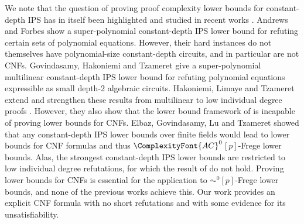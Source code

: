 \documentclass[11pt,letter]{article}
\theoremstyle{remark} %
\newcommand{\ACZ}{\ensuremath{\ComplexityFont{AC}^0}}
\begin{document}
{    %

    We note that the question of proving proof complexity lower bounds for constant-depth IPS has in itself been highlighted and studied in recent works \cite{AF22, GHT22, HLT24, EGLT25, BLRS25}. Andrews and Forbes \cite{AF22} show a super-polynomial constant-depth IPS lower bound for refuting certain sets of polynomial equations. However, their hard instances do not themselves have polynomial-size constant-depth circuits, and in particular are not CNFs. Govindasamy, Hakoniemi and Tzameret \cite{GHT22} give a super-polynomial multilinear constant-depth IPS lower bound for refuting polynomial equations expressible as small depth-2 algebraic circuits. Hakoniemi, Limaye and Tzameret \cite{HLT24} extend and strengthen these results from multilinear to low individual degree proofs  \cite{GHT22}. However, they also show that the lower bound framework of \cite{GHT22, HLT24} is incapable of proving lower bounds for CNFs. Elbaz, Govindasamy, Lu and Tzameret \cite{EGLT25} showed that any constant-depth IPS lower bounds over finite fields would lead to lower bounds for CNF formulas and thus \ACZ$[p]$-Frege lower bounds. Alas, the strongest constant-depth IPS lower bounds \cite{HLT24} are restricted to low individual degree refutations, for which the result of \cite{EGLT25} do not hold.
    Proving lower bounds for CNFs is essential for the application to $\AC^0[p]$-Frege lower bounds, and none of the previous works achieve this. Our work provides an explicit CNF formula with no short refutations and with some evidence for its unsatisfiability.
    
}
\end{document}
